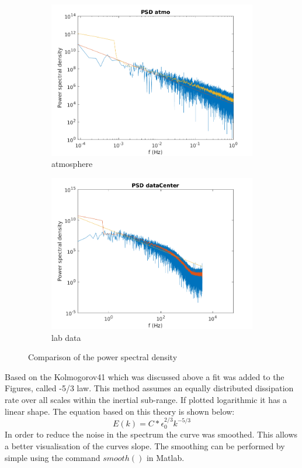 \documentclass[12pt]{article}
\begin{document}
\begin{figure}[H]
\begin{subfigure}{0.5\textwidth}
  \centering
  \includegraphics[width=1\linewidth]{figures/power_spectrum_atmo_smooth.png}
  \caption{atmosphere}
\end{subfigure}
\begin{subfigure}{0.5\textwidth}
  \centering
  \includegraphics[width=1\linewidth]{figures/power_spectrum_center_smooth.png}
  \caption{lab data}
\end{subfigure}
\caption{Comparison of the power spectral density}
\label{fig:comparison_fluc}
\end{figure}
Based on the Kolmogorov41 which was discussed above a fit was added to the Figures, called -5/3 law. This method assumes an equally distributed dissipation rate over all scales within the inertial sub-range. If plotted logarithmic it has a linear shape.
The equation based on this theory is shown below:
\begin{equation}
E(k) = C * \epsilon_0^{2/3}k^{-5/3}
\end{equation}
In order to reduce the noise in the spectrum the curve was smoothed. This allows a better visualisation of the curves slope. The smoothing can be performed by simple using the command $smooth()$ in Matlab.
\end{document}
